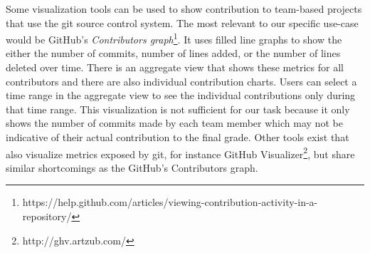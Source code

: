\documentclass[../manifest.tex]{subfiles}
\begin{document}
Some visualization tools can be used to show contribution to team-based projects that use the git source control system. The most relevant to our specific use-case would be GitHub's \textit{Contributors graph}\footnote{https://help.github.com/articles/viewing-contribution-activity-in-a-repository/}. It uses filled line graphs to show the either the number of commits, number of lines added, or the number of lines deleted over time. There is an aggregate view that shows these metrics for all contributors and there are also individual contribution charts. Users can select a time range in the aggregate view to see the individual contributions only during that time range. This visualization is not sufficient for our task because it only shows the number of commits made by each team member which may not be indicative of their actual contribution to the final grade. Other tools exist that also visualize metrics exposed by git, for instance GitHub Visualizer\footnote{http://ghv.artzub.com/}, but share similar shortcomings as the GitHub's Contributors graph.
\end{document}
